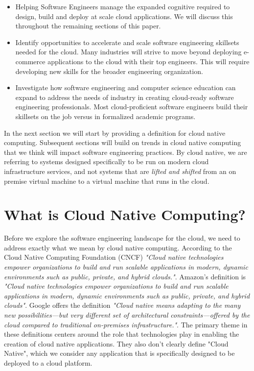 \documentclass[conference]{IEEEconf}
\begin{document}
\begin{itemize}
	\item Helping Software Engineers manage the expanded cognitive required to design, build and deploy at scale cloud applications. We will discuss this throughout the remaining sections of this paper. 
	\item Identify opportunities to accelerate and scale software engineering skillsets needed for the cloud. Many industries will strive to move beyond deploying e-commerce applications to the cloud with their top engineers. This will require developing new skills for the broader engineering organization.
	\item Investigate how software engineering and computer science education can expand to address the needs of industry in creating cloud-ready software engineering professionals. Most cloud-proficient software engineers build their skillsets on the job versus in formalized academic programs. 
\end{itemize}

In the next section we will start by providing a definition for cloud native computing. Subsequent sections will build on trends in cloud native computing that we think will impact software engineering practices.  By cloud native, we are referring to systems designed specifically to be run on modern cloud infrastructure services, and not systems that are \textit{lifted and shifted}\cite{CloudMigration2017} from an on premise virtual machine to a virtual machine that runs in the cloud. 


\section{What is Cloud Native Computing?}
\label{sec:WhatIsCNF}

Before we explore the software engineering landscape for the cloud, we need to address exactly what we mean by cloud native computing.  According to the Cloud Native Computing Foundation (CNCF)\cite{CNCFHome}  \textit{"Cloud native technologies empower organizations to build and run scalable applications in modern, dynamic environments such as public, private, and hybrid clouds."}.  Amazon's definition is \textit{"Cloud native technologies empower organizations to build and run scalable applications in modern, dynamic environments such as public, private, and hybrid clouds"}. Google offers the definition \textit{"Cloud native means adapting to the many new possibilities—but very different set of architectural constraints—offered by the cloud compared to traditional on-premises infrastructure."}.  The primary theme in these definitions centers around the role that technologies play in enabling the creation of cloud native applications.  They also don't clearly define "Cloud Native", which we consider any application that is specifically designed to be deployed to a cloud platform. 
\end{document}
